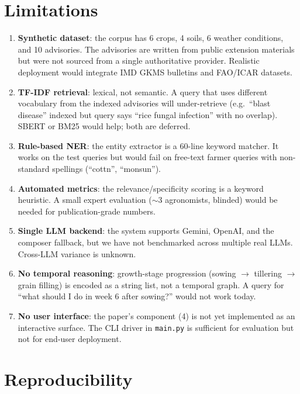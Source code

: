 \documentclass[11pt,a4paper]{article}
\begin{document}
\section{Limitations}\label{sec:limitations}
\begin{enumerate}[leftmargin=*]
  \item \textbf{Synthetic dataset}: the corpus has 6 crops, 4 soils,
        6 weather conditions, and 10 advisories. The advisories are
        written from public extension materials but were not sourced
        from a single authoritative provider. Realistic deployment
        would integrate IMD GKMS bulletins and FAO/ICAR datasets.
  \item \textbf{TF-IDF retrieval}: lexical, not semantic. A query
        that uses different vocabulary from the indexed advisories
        will under-retrieve (e.g.\ ``blast disease'' indexed but
        query says ``rice fungal infection'' with no overlap).
        SBERT or BM25 would help; both are deferred.
  \item \textbf{Rule-based NER}: the entity extractor is a 60-line
        keyword matcher. It works on the test queries but would fail
        on free-text farmer queries with non-standard spellings
        (``cottn'', ``monsun'').
  \item \textbf{Automated metrics}: the relevance/specificity scoring
        is a keyword heuristic. A small expert evaluation
        ($\sim$3 agronomists, blinded) would be needed for
        publication-grade numbers.
  \item \textbf{Single LLM backend}: the system supports Gemini,
        OpenAI, and the composer fallback, but we have not
        benchmarked across multiple real LLMs. Cross-LLM variance is
        unknown.
  \item \textbf{No temporal reasoning}: growth-stage progression
        (sowing $\to$ tillering $\to$ grain filling) is encoded as a
        string list, not a temporal graph. A query for ``what should
        I do in week 6 after sowing?'' would not work today.
  \item \textbf{No user interface}: the paper's component (4) is not
        yet implemented as an interactive surface. The CLI driver in
        \texttt{main.py} is sufficient for evaluation but not for
        end-user deployment.
\end{enumerate}

\section{Reproducibility}\label{sec:repro}
\end{document}
